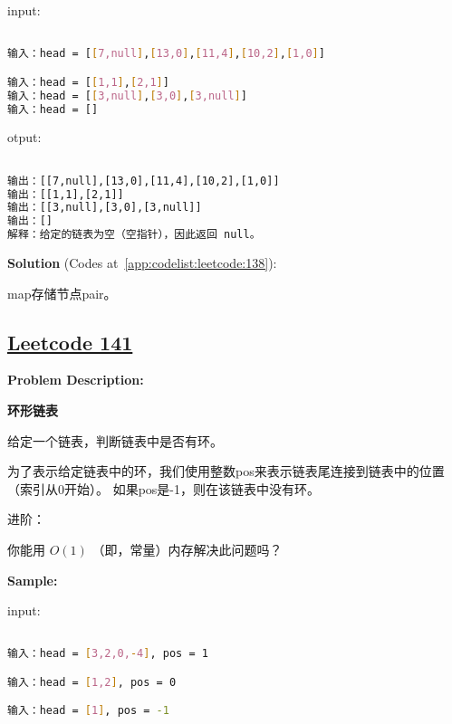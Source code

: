 input:\par

\begin{lstlisting}[language=bash]

输入：head = [[7,null],[13,0],[11,4],[10,2],[1,0]]

输入：head = [[1,1],[2,1]]
输入：head = [[3,null],[3,0],[3,null]]
输入：head = []


\end{lstlisting}

otput:\par

\begin{lstlisting}[language=bash]

输出：[[7,null],[13,0],[11,4],[10,2],[1,0]]
输出：[[1,1],[2,1]]
输出：[[3,null],[3,0],[3,null]]
输出：[]
解释：给定的链表为空（空指针），因此返回 null。


\end{lstlisting}

\textbf{Solution }(Codes at~\ref{app:codelist:leetcode:138}):\par

map存储节点pair。\par



\subsection{\href{https://leetcode-cn.com/}{Leetcode 141}}\label{app:problemlist:leetcode:141}

\textbf{Problem Description:}\par

\textbf{环形链表}\par

给定一个链表，判断链表中是否有环。\par

为了表示给定链表中的环，我们使用整数pos来表示链表尾连接到链表中的位置（索引从0开始）。
如果pos是-1，则在该链表中没有环。\par

进阶：\par

你能用 $ O(1) $ （即，常量）内存解决此问题吗？\par


\textbf{Sample:}\par

input:\par

\begin{lstlisting}[language=bash]

输入：head = [3,2,0,-4], pos = 1

输入：head = [1,2], pos = 0

输入：head = [1], pos = -1


\end{lstlisting}

